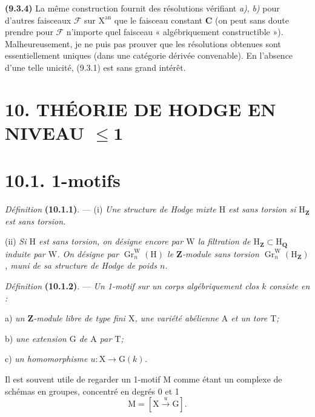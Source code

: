 \documentclass[11pt,leqno]{article}
\begin{document}
\textbf{(9.3.4)} La même construction fournit des résolutions vérifiant
\textit{a)}, \textit{b)} pour d’autres faisceaux \(\mathscr{F}\) sur
\(\mathrm{X}^{\mathrm{an}}\) que le faisceau constant \(\mathbf{C}\)
(on peut sans doute prendre pour \(\mathscr{F}\) n’importe quel faisceau
« algébriquement constructible »). Malheureusement, je ne puis pas
prouver que les résolutions obtenues sont essentiellement uniques
(dans une catégorie dérivée convenable). En l’absence d’une telle
unicité, (9.3.1) est sans grand intérêt.

\section*{10. THÉORIE DE HODGE EN NIVEAU \(\leq\mathbf{1}\)}

\section*{10.1. 1-motifs}

\textit{Définition} \textbf{(10.1.1)}. — (i)
\textit{Une structure de Hodge mixte \(\mathrm{H}\) est
\textup{sans torsion} si \(\mathrm{H}_{\mathbf{Z}}\) est sans torsion.}

(ii) \textit{Si \(\mathrm{H}\) est sans torsion, on désigne encore par
\(\mathrm{W}\) la filtration de
\(\mathrm{H}_{\mathbf{Z}}\subset\mathrm{H}_{\mathbf{Q}}\) induite par
\(\mathrm{W}\). On désigne par
\(\operatorname{Gr}^{\mathrm{W}}_n(\mathrm{H})\) le
\(\mathbf{Z}\)-module sans torsion
\(\operatorname{Gr}^{\mathrm{W}}_n(\mathrm{H}_{\mathbf{Z}})\), muni de
sa structure de Hodge de poids \(n\).}

\textit{Définition} \textbf{(10.1.2)}. —
\textit{Un \textup{1-motif} sur un corps algébriquement clos \(k\)
consiste en :}

\noindent a) \textit{un \(\mathbf{Z}\)-module libre de type fini
\(\mathrm{X}\), une variété abélienne \(\mathrm{A}\) et un tore
\(\mathrm{T}\);}\par
\noindent b) \textit{une extension \(\mathrm{G}\) de \(\mathrm{A}\)
par \(\mathrm{T}\);}\par
\noindent c) \textit{un homomorphisme
\(u:\mathrm{X}\to\mathrm{G}(k)\).}

Il est souvent utile de regarder un 1-motif \(\mathrm{M}\) comme étant
un complexe de schémas en groupes, concentré en degrés 0 et 1
\[
\mathrm{M}=[\mathrm{X}\xrightarrow{u}\mathrm{G}].
\]
\end{document}

